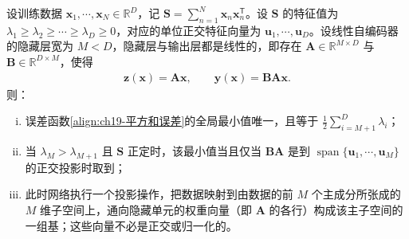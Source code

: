 \documentclass[../../main.tex]{subfiles}
\begin{document}
\begin{theorem}[线性自编码器的最优解与主成分分析]\label{theorem:ch19-线性AE与PCA}
设训练数据 $\bm{x}_1,\cdots,\bm{x}_N\in\mathbb{R}^{D}$，记 $\bm{S}=\sum_{n=1}^{N}\bm{x}_n\bm{x}_n^{\mathsf T}$。设 $\bm{S}$ 的特征值为 $\lambda_1\geqslant\lambda_2\geqslant\cdots\geqslant\lambda_D\geqslant0$，对应的单位正交特征向量为 $\bm{u}_1,\cdots,\bm{u}_D$。设线性自编码器的隐藏层宽为 $M<D$，隐藏层与输出层都是线性的，即存在 $\bm{A}\in\mathbb{R}^{M\times D}$ 与 $\bm{B}\in\mathbb{R}^{D\times M}$，使得
\begin{align*}
\bm{z}(\bm{x})=\bm{A}\bm{x},\qquad \bm{y}(\bm{x})=\bm{B}\bm{A}\bm{x}.
\end{align*}
则：
\begin{enumerate}[(i)]
\item 误差函数\eqref{align:ch19-平方和误差}的全局最小值唯一，且等于 $\frac{1}{2}\sum_{i=M+1}^{D}\lambda_i$；
\item 当 $\lambda_M>\lambda_{M+1}$ 且 $\bm{S}$ 正定时，该最小值当且仅当 $\bm{B}\bm{A}$ 是到 $\operatorname{span}\{\bm{u}_1,\cdots,\bm{u}_M\}$ 的正交投影时取到；
\item 此时网络执行一个投影操作，把数据映射到由数据的前 $M$ 个主成分所张成的 $M$ 维子空间上，通向隐藏单元的权重向量（即 $\bm{A}$ 的各行）构成该主子空间的一组基；这些向量不必是正交或归一化的。
\end{enumerate}
\end{theorem}
\end{document}

